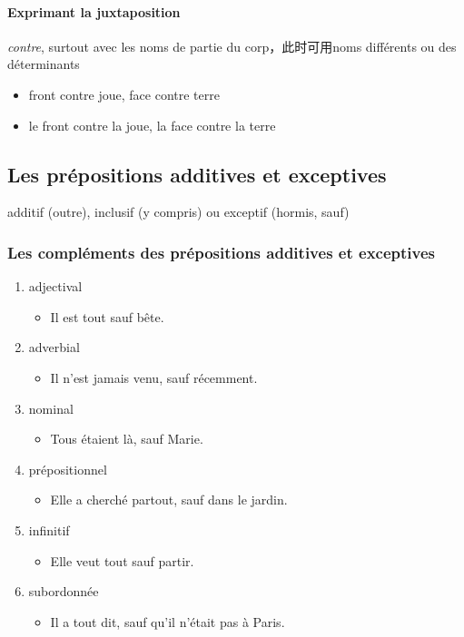 \documentclass[UTF8]{report}
\begin{document}
\paragraph{Exprimant la juxtaposition}
\textit{contre}, surtout avec les noms de partie du corp，此时可用noms différents ou des déterminants
\begin{itemize}
    \item front contre joue, face contre terre
    \item le front contre la joue, la face contre la terre
\end{itemize}

\subsection{Les prépositions additives et exceptives}
additif (outre), inclusif (y compris) ou exceptif (hormis, sauf)
\subsubsection{Les compléments des prépositions additives et exceptives}
\begin{enumerate}
    \item adjectival
    \begin{itemize}
        \item Il est tout sauf bête.
    \end{itemize}
    \item adverbial
    \begin{itemize}
        \item Il n’est jamais venu, sauf récemment.
    \end{itemize}
    \item nominal
    \begin{itemize}
        \item Tous étaient là, sauf Marie.
    \end{itemize}
    \item prépositionnel
    \begin{itemize}
        \item Elle a cherché partout, sauf dans le jardin.
    \end{itemize}
    \item infinitif
    \begin{itemize}
        \item Elle veut tout sauf partir.
    \end{itemize}
    \item subordonnée
    \begin{itemize}
        \item Il a tout dit, sauf qu’il n’était pas à Paris.
    \end{itemize}
\end{enumerate}
\end{document}
